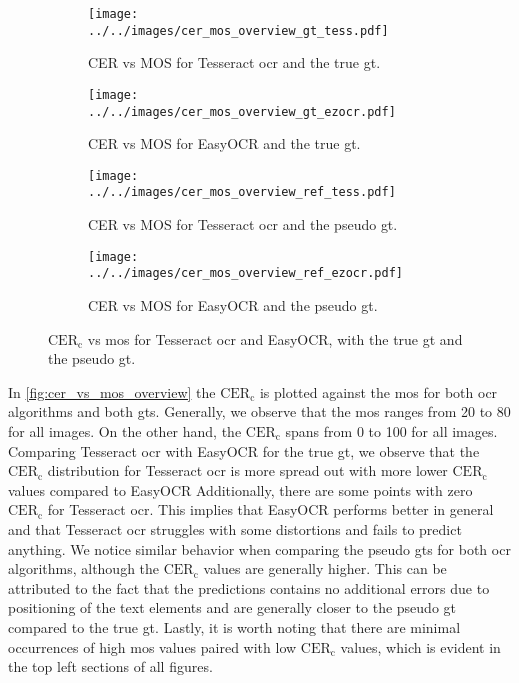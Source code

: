 \begin{figure}[h!]
    \begin{subfigure}[b]{0.45\textwidth}
        \centering
        \texttt{[image: ../../images/cer\_mos\_overview\_gt\_tess.pdf]}
        \caption{CER vs MOS for Tesseract \gls{ocr} and the true \gls{gt}.}
        \label{fig:cer_vs_mos_gt_tess}
    \end{subfigure}
    \hfill
    \begin{subfigure}[b]{0.45\textwidth}
        \centering
        \texttt{[image: ../../images/cer\_mos\_overview\_gt\_ezocr.pdf]}
        \caption{CER vs MOS for EasyOCR and the true \gls{gt}.}
        \label{fig:cer_vs_mos_gt_ocr}
    \end{subfigure}
    \newline
    \begin{subfigure}[b]{0.45\textwidth}
        \centering
        \texttt{[image: ../../images/cer\_mos\_overview\_ref\_tess.pdf]}
        \caption{CER vs MOS for Tesseract \gls{ocr} and the pseudo \gls{gt}.}
        \label{fig:cer_vs_mos_ref_tess}
    \end{subfigure}
    \hfill
    \begin{subfigure}[b]{0.45\textwidth}
        \centering
        \texttt{[image: ../../images/cer\_mos\_overview\_ref\_ezocr.pdf]}
        \caption{CER vs MOS for EasyOCR and the pseudo \gls{gt}.}
        \label{fig:cer_vs_mos_ref_ocr}
    \end{subfigure}
    \caption{$\text{CER}_{\text{c}}$ vs \gls{mos} for Tesseract \gls{ocr} and EasyOCR, with the true \gls{gt} and the pseudo \gls{gt}.}
    \label{fig:cer_vs_mos_overview}
\end{figure}

In \autoref{fig:cer_vs_mos_overview} the $\text{CER}_{\text{c}}$ is plotted against the \gls{mos} for both \gls{ocr} algorithms and both \glspl{gt}.
Generally, we observe that the \gls{mos} ranges from 20 to 80 for all images.
On the other hand, the $\text{CER}_{\text{c}}$ spans from 0 to 100 for all images.
Comparing Tesseract \gls{ocr} with EasyOCR for the true \gls{gt}, we observe that the $\text{CER}_{\text{c}}$ distribution for Tesseract \gls{ocr} is more spread out with more lower $\text{CER}_{\text{c}}$ values compared to EasyOCR
Additionally, there are some points with zero $\text{CER}_{\text{c}}$ for Tesseract \gls{ocr}.
This implies that EasyOCR performs better in general and that Tesseract \gls{ocr} struggles with some distortions and fails to predict anything.
We notice similar behavior when comparing the pseudo \glspl{gt} for both \gls{ocr} algorithms, although the $\text{CER}_{\text{c}}$ values are generally higher.
This can be attributed to the fact that the predictions contains no additional errors due to positioning of the text elements and are generally closer to the pseudo \gls{gt} compared to the true \gls{gt}.
Lastly, it is worth noting that there are minimal occurrences of high \gls{mos} values paired with low $\text{CER}_{\text{c}}$ values, which is evident in the top left sections of all figures.



